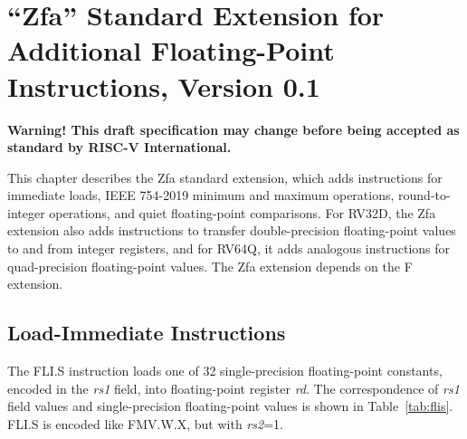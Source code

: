 \chapter{``Zfa'' Standard Extension for Additional Floating-Point
Instructions, Version 0.1}
\label{chap:zfa}

{\bf Warning! This draft specification may change before being
accepted as standard by RISC-V International.}

This chapter describes the Zfa standard extension, which adds instructions for
immediate loads,
IEEE 754-2019 minimum and maximum operations,
round-to-integer operations,
and quiet floating-point comparisons.
For RV32D, the Zfa extension also adds instructions to transfer
double-precision floating-point values to and from integer registers, and for
RV64Q, it adds analogous instructions for quad-precision floating-point
values.
The Zfa extension depends on the F extension.


\section{Load-Immediate Instructions}

The FLI.S instruction loads one of 32 single-precision
floating-point constants, encoded in the {\em rs1} field, into
floating-point register {\em rd}.
The correspondence of {\em rs1} field values and single-precision
floating-point values is shown in Table~\ref{tab:flis}.
FLI.S is encoded like FMV.W.X, but with {\em rs2}=1.

